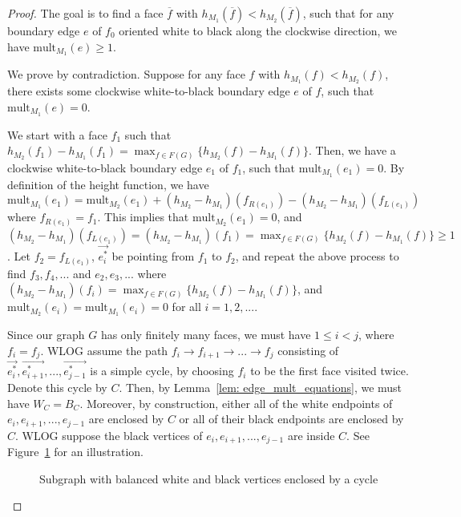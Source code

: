 \documentclass[11pt]{amsart}
\theoremstyle{definition}
\theoremstyle{remark}
\numberwithin{equation}{section}
\begin{document}
\begin{proof}
    The goal is to find a face $\overline{f}$ with $h_{M_1}(\overline{f}) < h_{M_2}(\overline{f})$, such that for any boundary edge $e$ of $f_0$ oriented white to black along the clockwise direction, we have $\text{mult}_{M_1}(e)\geq 1$. 

    We prove by contradiction. Suppose for any face $f$ with $h_{M_1}(f) < h_{M_2}(f)$, there exists some clockwise white-to-black boundary edge $e$ of $f$, such that $\text{mult}_{M_1}(e) = 0$. 
    
    We start with a face $f_1$ such that $h_{M_2}(f_1)-h_{M_1}(f_1) = \max_{f\in F(G)}\{h_{M_2}(f)-h_{M_1}(f)\}$. Then, we have a clockwise white-to-black boundary edge $e_1$ of $f_1$, such that $\text{mult}_{M_1}(e_1) = 0$. By definition of the height function, we have
    \begin{equation}
        \text{mult}_{M_1}(e_1) = \text{mult}_{M_2}(e_1) + (h_{M_2}-h_{M_1})(f_{R(e_1)}) - (h_{M_2}-h_{M_1})(f_{L(e_1)})
    \end{equation}
    where $f_{R(e_1)} = f_1$. This implies that $\text{mult}_{M_2}(e_1) = 0$, and $(h_{M_2}-h_{M_1})(f_{L(e_1)}) = (h_{M_2}-h_{M_1})(f_1) = \max_{f\in F(G)}\{h_{M_2}(f)-h_{M_1}(f)\}\geq 1$. Let $f_2 = f_{L(e_1)}$, $\Vec{e^*_i}$ be pointing from $f_1$ to $f_2$, and repeat the above process to find $f_3,f_4,...$ and $e_2,e_3,...$ where $(h_{M_2}-h_{M_1})(f_{i}) = \max_{f\in F(G)}\{h_{M_2}(f)-h_{M_1}(f)\}$, and $\text{mult}_{M_2}(e_i) = \text{mult}_{M_1}(e_i) = 0$ for all $i=1,2,...$.

    Since our graph $G$ has only finitely many faces, we must have $1\leq i < j$, where $f_i = f_j$. WLOG assume the path $f_i\rightarrow f_{i+1}\rightarrow...\rightarrow f_j$ consisting of $\Vec{e^*_i}, \Vec{e^*_{i+1}},...,\Vec{e^*_{j-1}}$ is a simple cycle, by choosing $f_i$ to be the first face visited twice. Denote this cycle by $C$. Then, by Lemma~\ref{lem: edge_mult_equations}, we must have $W_C = B_C$. Moreover, by construction, either all of the white endpoints of $e_{i},e_{i+1},...,e_{j-1}$ are enclosed by $C$ or all of their black endpoints are enclosed by $C$. WLOG suppose the black vertices of $e_{i},e_{i+1},...,e_{j-1}$ are inside $C$. See Figure~\ref{fig:distributive_pf_contradiction} for an illustration. 

    \begin{figure}[h!]
    \centering
    
    \caption{Subgraph with balanced white and black vertices enclosed by a cycle}
    \label{fig:distributive_pf_contradiction}
    \end{figure}


\end{proof}
\end{document}
